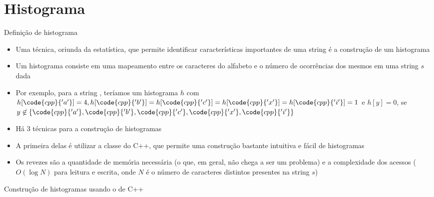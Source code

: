 \section{Histograma}

\begin{frame}[fragile]{Definição de histograma}

    \begin{itemize}
        \item Uma técnica, oriunda da estatística, que permite identificar características 
        importantes de uma string é a construção de um histograma
        \pause

        \item Um histograma consiste em uma mapeamento entre os caracteres do alfabeto e o número 
            de ocorrências dos mesmos em uma string $s$ dada
        \pause

        \item Por exemplo, para a string , teríamos um histograma $h$ com
        $h[\code{cpp}{'a'}] = 4, h[\code{cpp}{'b'}] = h[\code{cpp}{'c'}] = h[\code{cpp}{'x'}] = h[\code{cpp}{'i'}] = 1$ e $h[y] = 0$, se $y \not \in \lbrace \code{cpp}{'a'}, \code{cpp}{'b'}, \code{cpp}{'c'}, \code{cpp}{'x'}, \code{cpp}{'i'}\rbrace$
        \pause

        \item Há 3 técnicas para a construção de histogramas
        \pause

        \item A primeira delas é utilizar a classe  do C++, que permite uma 
            construção bastante intuitiva e fácil de histogramas
        \pause

        \item Os revezes são a quantidade de memória necessária (o que, em geral, não chega a ser 
            um problema) e a complexidade dos acessos ($O(\log N)$ para leitura e escrita, onde
            $N$ é o número de caracteres distintos presentes na string $s$)
    \end{itemize}

\end{frame}

\begin{frame}[fragile]{Construção de histogramas usando o  de C++} 
\end{frame}

